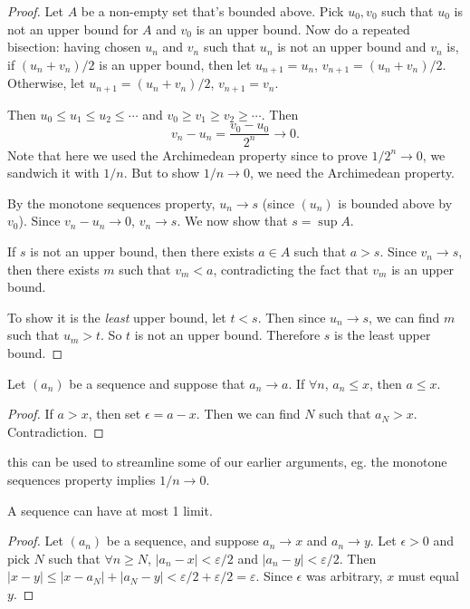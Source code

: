 \documentclass[a4paper]{article}
\begin{document}
\begin{proof}
  Let $A$ be a non-empty set that's bounded above. Pick $u_0, v_0$ such that $u_0$ is not an upper bound for $A$ and $v_0$ is an upper bound. Now do a repeated bisection: having chosen $u_n$ and $v_n$ such that $u_n$ is not an upper bound and $v_n$ is, if $(u_n + v_n)/2$ is an upper bound, then let $u_{n + 1} = u_n$, $v_{n + 1} = (u_n + v_n)/2$. Otherwise, let $u_{n + 1} = (u_n + v_n)/2$, $v_{n + 1} = v_n$.

  Then $u_0 \leq u_1 \leq u_2 \leq \cdots$ and $v_0\geq v_1 \geq v_2 \geq \cdots$. Then
  \[
    v_n - u_n = \frac{v_0 - u_0}{2^n} \to 0.
  \]
  Note that here we used the Archimedean property since to prove $1/2^n \to 0$, we sandwich it with $1/n$. But to show $1/n\to 0$, we need the Archimedean property.

  By the monotone sequences property, $u_n\to s$ (since $(u_n)$ is bounded above by $v_0$). Since $v_n - u_n \to 0$, $v_n \to s$. We now show that $s = \sup A$.

  If $s$ is not an upper bound, then there exists $a\in A$ such that $a > s$. Since $v_n \to s$, then there exists $m$ such that $v_m < a$, contradicting the fact that $v_m$ is an upper bound.

  To show it is the \emph{least} upper bound, let $t < s$. Then since $u_n \to s$, we can find $m$ such that $u_m > t$. So $t$ is not an upper bound. Therefore $s$ is the least upper bound.
\end{proof}

\begin{lemma}
  Let $(a_n)$ be a sequence and suppose that $a_n \to a$. If $\forall n$, $a_n \leq x$, then $a\leq x$.
\end{lemma}

\begin{proof}
  If $a > x$, then set $\epsilon = a - x$. Then we can find $N$ such that $a_N > x$. Contradiction.
\end{proof}
\note this can be used to streamline some of our earlier arguments, eg. the monotone sequences property implies $1/n \to 0$.

\begin{lemma}
  A sequence can have at most 1 limit.
\end{lemma}

\begin{proof}
Let $(a_n)$ be a sequence, and suppose $a_n \to x$ and $a_n\to y$. Let $\epsilon > 0$ and pick $N$ such that $\forall n \geq N$, $|a_n - x| < \varepsilon/2$ and $|a_n - y| < \varepsilon/2$. Then $|x - y| \leq |x - a_N| + |a_N - y| < \varepsilon/2 + \varepsilon/2 = \varepsilon$. Since $\epsilon$ was arbitrary, $x$ must equal $y$.
\end{proof}
\end{document}
